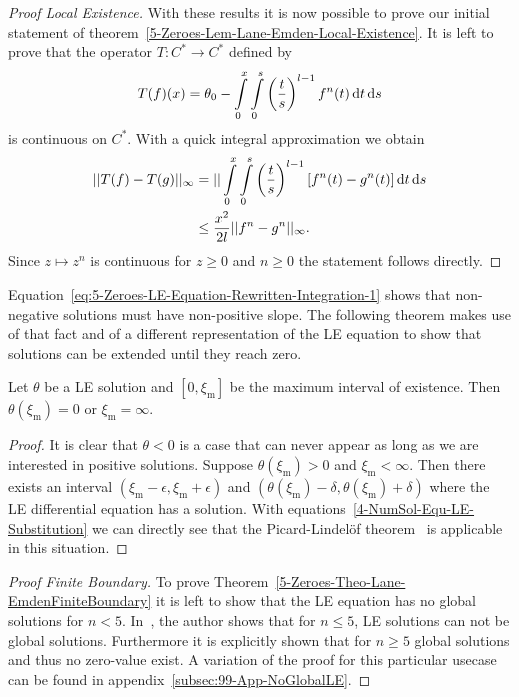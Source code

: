 \begin{proof}[Proof  Local Existence]
	With these results it is now possible to prove our initial statement of theorem~\ref{5-Zeroes-Lem-Lane-Emden-Local-Existence}.
	It is left to prove that the operator $T:C^*\rightarrow C^*$ defined by
	\begin{equation}
		T(f)(x) = \theta_0 - \int\limits_0^x\int\limits_0^s \left(\frac{t}{s}\right)^{l-1}f^n(t)\mathop{}\!\mathrm{d} t\mathop{}\!\mathrm{d} s
		\label{eq:5-Zeroes-LE-Definition-Operator-On-C-Star}
	\end{equation}
	is continuous on $C^*$.
	With a quick integral approximation we obtain
	\begin{align}
		||T(f)-T(g)||_{\infty} &= ||\int\limits_0^x\int\limits_0^s \left(\frac{t}{s}\right)^{l-1}\left[f^n(t)-g^n(t)\right]\mathop{}\!\mathrm{d} t\mathop{}\!\mathrm{d} s\\
		&\leq \frac{x^2}{2l}||f^n-g^n||_{\infty}.
	\end{align}
	Since $z\mapsto z^n$ is continuous for $z\geq0$ and $n\geq0$ the statement follows directly.
\end{proof}\noindent
Equation~\eqref{eq:5-Zeroes-LE-Equation-Rewritten-Integration-1} shows that non-negative solutions must have non-positive slope.
The following theorem makes use of that fact and of a different representation of the \ac{LE} equation to show that solutions can be extended until they reach zero.
\begin{lemma}
	Let $\theta$ be a \ac{LE} solution and $[0,\xi_\textrm{m}]$ be the maximum interval of existence.
	Then $\theta(\xi_\textrm{m})=0$ or $\xi_\textrm{m}=\infty$.
\end{lemma}
\begin{proof}
	It is clear that $\theta<0$ is a case that can never appear as long as we are interested in positive solutions.
	Suppose $\theta(\xi_\textrm{m})>0$ and $\xi_\textrm{m}<\infty$.
	Then there exists an interval $(\xi_\textrm{m}-\epsilon,\xi_\textrm{m}+\epsilon)$ and $(\theta(\xi_\textrm{m})-\delta,\theta(\xi_\textrm{m})+\delta)$ where the \ac{LE} differential equation has a solution.
	With equations~\ref{4-NumSol-Equ-LE-Substitution} we can directly see that the Picard-Lindelöf theorem~\cite{lindelofApplicationMethodeApproximations1894} is applicable in this situation.
\end{proof}
\begin{proof}[Proof  Finite Boundary]
	To prove Theorem~\ref{5-Zeroes-Theo-Lane-EmdenFiniteBoundary} it is left to show that the \ac{LE} equation has no global solutions for $n<5$.
	In~\cite[p.~36]{quittnerSuperlinearParabolicProblems2007}, the author shows that for $n\leq5$, \ac{LE} solutions can not be global solutions.
	Furthermore it is explicitly shown that for $n\geq5$ global solutions and thus no zero-value exist.
	A variation of the proof for this particular usecase can be found in appendix~\ref{subsec:99-App-NoGlobalLE}.
\end{proof}
%
%

